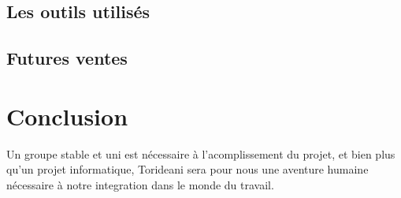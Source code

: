 \documentclass[12pt]{report}
\begin{document}
    \section{Les outils utilisés}
    \section{Futures ventes}

\chapter{Conclusion}
Un groupe stable et uni est nécessaire à l'acomplissement du
projet, et bien plus qu'un projet informatique, Torideani sera pour
nous une aventure humaine nécessaire à notre integration dans le
monde du travail.
\end{document}
